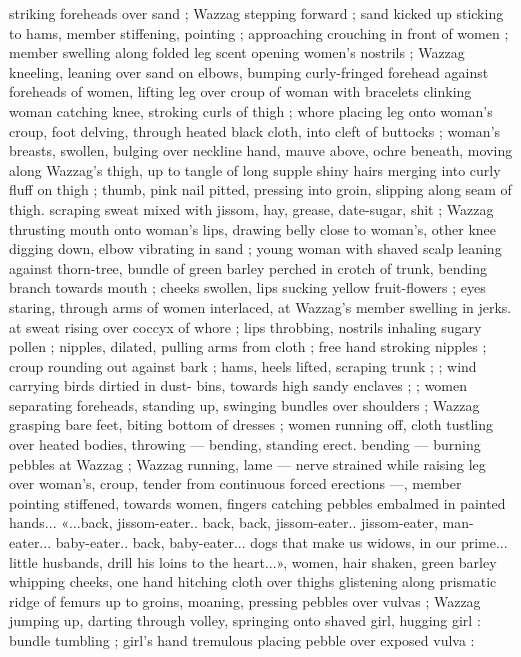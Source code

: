 striking foreheads over sand ; Wazzag stepping forward ; sand kicked
up sticking to hams, member stiffening, pointing ; approaching
crouching in front of women ; member swelling along folded leg
scent opening women's nostrils ; Wazzag kneeling, leaning over sand
on elbows, bumping curly-fringed forehead against foreheads of
women, lifting leg over croup of woman with bracelets clinking
woman catching knee, stroking curls of thigh ; whore placing leg
onto woman's croup, foot delving, through heated black cloth, into
cleft of buttocks ; woman's breasts, swollen, bulging over neckline
hand, mauve above, ochre beneath, moving along Wazzag's thigh, up
to tangle of long supple shiny hairs merging into curly fluff on thigh
; thumb, pink nail pitted, pressing into groin, slipping along seam of
thigh. scraping sweat mixed with jissom, hay, grease, date-sugar, shit
; Wazzag thrusting mouth onto woman's lips, drawing belly close to
woman's, other knee digging down, elbow vibrating in sand ; young
woman with shaved scalp leaning against thorn-tree, bundle of green
barley perched in crotch of trunk, bending branch towards mouth ;
cheeks swollen, lips sucking yellow fruit-flowers ; eyes staring,
through arms of women interlaced, at Wazzag’s member swelling in
jerks. at sweat rising over coccyx of whore ; lips throbbing, nostrils
inhaling sugary pollen ; nipples, dilated, pulling arms from cloth ;
free hand stroking nipples ; croup rounding out against bark ; hams,
heels lifted, scraping trunk ; ; wind carrying birds dirtied in dust-
bins, towards high sandy enclaves ; ; women separating foreheads,
standing up, swinging bundles over shoulders ; Wazzag grasping
bare feet, biting bottom of dresses ; women running off, cloth
tustling over heated bodies, throwing --- bending, standing erect.
bending --- burning pebbles at Wazzag ; Wazzag running, lame ---
nerve strained while raising leg over woman's, croup, tender from
continuous forced erections ---, member pointing stiffened, towards
women, fingers catching pebbles embalmed in painted hands...
«...back, jissom-eater.. back, back, jissom-eater.. jissom-eater, man-
eater... baby-eater.. back, baby-eater... dogs that make us widows, in
our prime... little husbands, drill his loins to the heart...», women,
hair shaken, green barley whipping cheeks, one hand hitching cloth
over thighs glistening along prismatic ridge of femurs up to groins,
moaning, pressing pebbles over vulvas ; Wazzag jumping up, darting
through volley, springing onto shaved girl, hugging girl : bundle
tumbling ; girl's hand tremulous placing pebble over exposed vulva :
